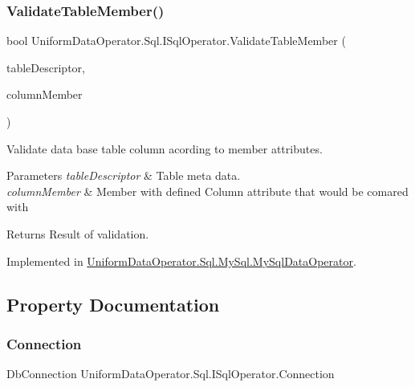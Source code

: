 \subsubsection{\texorpdfstring{Validate\+Table\+Member()}{ValidateTableMember()}}
{\footnotesize\ttfamily bool Uniform\+Data\+Operator.\+Sql.\+I\+Sql\+Operator.\+Validate\+Table\+Member (\begin{DoxyParamCaption}\item[{\mbox{\hyperlink{class_uniform_data_operator_1_1_sql_1_1_attributes_1_1_table}{Table}}}]{table\+Descriptor,  }\item[{Member\+Info}]{column\+Member }\end{DoxyParamCaption})}



Validate data base table column acording to member attributes. 


\begin{DoxyParams}{Parameters}
{\em table\+Descriptor} & Table meta data.\\
\hline
{\em column\+Member} & Member with defined Column attribute that would be comared with \\
\hline
\end{DoxyParams}
\begin{DoxyReturn}{Returns}
Result of validation.
\end{DoxyReturn}


Implemented in \mbox{\hyperlink{class_uniform_data_operator_1_1_sql_1_1_my_sql_1_1_my_sql_data_operator_a233ab791c68b93aded97bfd9986767e8}{Uniform\+Data\+Operator.\+Sql.\+My\+Sql.\+My\+Sql\+Data\+Operator}}.



\subsection{Property Documentation}
\mbox{\label{interface_uniform_data_operator_1_1_sql_1_1_i_sql_operator_a99f034a986828e96955e3187cdfb28da}} 
\subsubsection{\texorpdfstring{Connection}{Connection}}
{\footnotesize\ttfamily Db\+Connection Uniform\+Data\+Operator.\+Sql.\+I\+Sql\+Operator.\+Connection\hspace{0.3cm}{\ttfamily [get]}}



